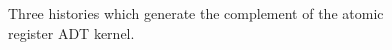 \begin{example}
\begin{figure}[t]
    \caption{Three histories which generate the complement of the atomic
      register ADT kernel.}
    \label{fig:register-patterns}
  \end{figure}

\end{example}
